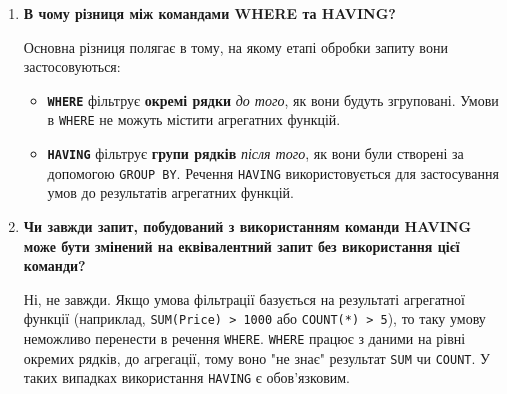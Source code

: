 \documentclass{article}
\begin{document}
\begin{enumerate}[label=\arabic*., leftmargin=*]
        Логічна послідовність виконання та синтаксичний порядок цих речень є таким:
        \begin{enumerate}
            \item \texttt{FROM} -- вказує на джерело даних.
            \item \texttt{WHERE} -- фільтрує рядки до групування.
            \item \texttt{GROUP BY} -- групує відфільтровані рядки.
            \item \texttt{HAVING} -- фільтрує групи після групування.
            \item \texttt{SELECT} -- вибирає фінальні стовпці.
            \item \texttt{ORDER BY} -- сортує кінцевий результат.
        \end{enumerate}
        Отже, правильний синтаксичний порядок: \texttt{WHERE}, потім \texttt{GROUP BY}, і в кінці \texttt{ORDER BY}.
        
        \item \textbf{В чому різниця між командами WHERE та HAVING?}
        
        Основна різниця полягає в тому, на якому етапі обробки запиту вони застосовуються:
        \begin{itemize}
            \item \textbf{\texttt{WHERE}} фільтрує \textbf{окремі рядки} \textit{до того}, як вони будуть згруповані. Умови в \texttt{WHERE} не можуть містити агрегатних функцій.
            \item \textbf{\texttt{HAVING}} фільтрує \textbf{групи рядків} \textit{після того}, як вони були створені за допомогою \texttt{GROUP BY}. Речення \texttt{HAVING} використовується для застосування умов до результатів агрегатних функцій.
        \end{itemize}
        
        \item \textbf{Чи завжди запит, побудований з використанням команди HAVING може бути змінений на еквівалентний запит без використання цієї команди?}
        
        Ні, не завжди. Якщо умова фільтрації базується на результаті агрегатної функції (наприклад, \texttt{SUM(Price) > 1000} або \texttt{COUNT(*) > 5}), то таку умову неможливо перенести в речення \texttt{WHERE}. \texttt{WHERE} працює з даними на рівні окремих рядків, до агрегації, тому воно "не знає" результат \texttt{SUM} чи \texttt{COUNT}. У таких випадках використання \texttt{HAVING} є обов'язковим.
        

\end{enumerate}
\end{document}
